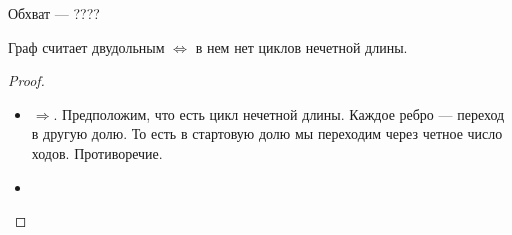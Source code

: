 \begin{definition}
    Обхват --- ????
\end{definition}
\begin{definition}
    Граф считает двудольным $\iff$ в нем нет циклов нечетной длины.
\end{definition}
\begin{proof}
    \slashn
    \begin{itemize}
        \item $\Rightarrow$. Предположим, что есть цикл нечетной длины. Каждое ребро --- переход в другую долю. То есть в стартовую долю мы переходим через четное число ходов. Противоречие.
        \item 
    \end{itemize}
\end{proof}
